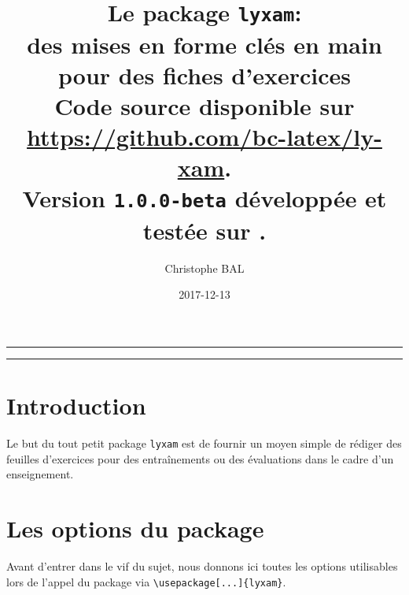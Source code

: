 \documentclass[12pt,a4paper]{scrartcl}
\theoremstyle{definition}
\begin{document}
\renewcommand\labelitemi{\raisebox{0.125em}{\tiny\textbullet}}
\renewcommand{\labelitemii}{---}

\title{%
	Le package \texttt{lyxam}:\\%
	des mises en forme clés en main\\%
	pour des fiches d'exercices\\%
	{\footnotesize Code source disponible sur \url{https://github.com/bc-latex/ly-xam}.}\\%
	{\footnotesize Version \texttt{1.0.0-beta} développée et testée sur \macosxname{}.}%
}
\author{Christophe BAL}
\date{2017-12-13}

\maketitle


\vspace{2em}

\hrule

\tableofcontents

\vspace{1.5em}

\hrule

\newpage



\section{Introduction}

Le but du tout petit package \verb+lyxam+ est de fournir un moyen simple de rédiger des feuilles d'exercices pour des entraînements ou des évaluations dans le cadre d'un enseignement.




\section{Les options du package}

Avant d'entrer dans le vif du sujet, nous donnons ici toutes les options utilisables lors de l'appel du package via \verb+\usepackage[...]{lyxam}+.
\end{document}
